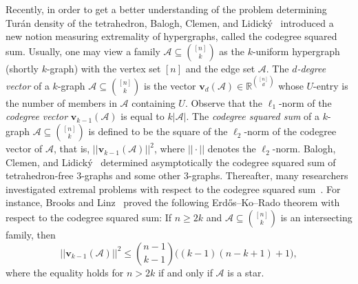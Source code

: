\documentclass[10pt,a4paper]{amsart}
\numberwithin{equation}{section}
\def\RR{\mathbb{R}}
\def\A{\mathcal{A}}
\begin{document}
Recently,
in order to get a better understanding of the problem determining Tur\'an density of the tetrahedron,
Balogh, Clemen, and Lidick\'y~\cite{Baloghsy,Balogh} introduced a new notion measuring extremality of hypergraphs, called the codegree squared sum.
Usually, one may view a family $\A \subseteq \binom{[n]}{k}$ as the $k$-uniform hypergraph (shortly $k$-graph) with the vertex set $[n]$ and the edge set $\A$.
The {\em $d$-degree vector} of a $k$-graph $\A\subseteq \binom{[n]}{k}$ is the vector
$\mathbf{v}_d(\A) \in \RR^{\binom{[n]}{d}}$
whose $U$-entry is the number of members in $\A$ containing $U$.
Observe that the  $\ell_1$-norm of the {\em codegree vector} $\mathbf{v}_{k-1}(\A)$ is equal to $k|\A|$.
The {\em codegree squared sum} of a $k$-graph $\A\subseteq \binom{[n]}{k}$ is defined to be the square of the $\ell_2$-norm of the codegree vector of $\A$, that is, $||\mathbf{v}_{k-1}(\A)||^2$,
where $||\cdot||$ denotes the $\ell_2$-norm.
Balogh, Clemen, and Lidick\'y~\cite{Baloghsy,Balogh}
determined asymptotically the codegree squared sum of tetrahedron-free $3$-graphs and some other $3$-graphs.
Thereafter, many researchers investigated extremal problems with respect to the codegree squared sum~\cite{Brooks,Wu,Cao}.
For instance, Brooks and Linz~\cite[Theorem 1.3]{Brooks} proved the following Erd\H{o}s--Ko--Rado theorem with respect to the codegree squared sum: If $n\geq 2k$ and $\A\subseteq \binom{[n]}{k}$ is an intersecting family,
then
$$||\mathbf{v}_{k-1}(\A)||^2
\leq   \binom{n-1}{k-1}\big((k-1)(n-k+ 1)+1\big),$$
where the equality holds for $n>2k$ if and only if $\A$ is a star.
\end{document}

